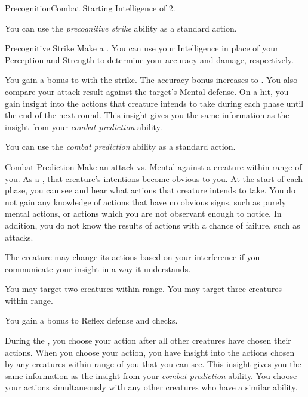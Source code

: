     \begin{feat}{Precognition}{Combat}
        \featpre Starting Intelligence of 2.

         You can use the \textit{precognitive strike} ability as a standard action.
        \begin{freeability}{Precognitive Strike}
            Make a .
            You can use your Intelligence in place of your Perception and Strength to determine your accuracy and damage, respectively.

            \rankline
             You gain a  bonus to  with the strike.
             The accuracy bonus increases to .
             You also compare your attack result against the target's Mental defense.
            On a hit, you gain insight into the actions that creature intends to take during each phase until the end of the next round.
            This insight gives you the same information as the insight from your \textit{combat prediction} ability.
        \end{freeability}

         You can use the \textit{combat prediction} ability as a standard action.
        \begin{freeability}{Combat Prediction}
            Make an attack vs. Mental against a creature within \rngmed range of you.
            \hit As a , that creature's intentions become obvious to you.
            At the start of each phase, you can see and hear what actions that creature intends to take.
            You do not gain any knowledge of actions that have no obvious signs, such as purely mental actions, or actions which you are not observant enough to notice.
            In addition, you do not know the results of actions with a chance of failure, such as attacks.

            The creature may change its actions based on your interference if you communicate your insight in a way it understands.

            \rankline
             You may target two creatures within range.
             You may target three creatures within range.
        \end{freeability}

         You gain a  bonus to Reflex defense and  checks.

         During the , you choose your action after all other creatures have chosen their actions.
        When you choose your action, you have insight into the actions chosen by any creatures within \rngclose range of you that you can see.
        This insight gives you the same information as the insight from your \textit{combat prediction} ability.
        You choose your actions simultaneously with any other creatures who have a similar ability.


\end{feat}
